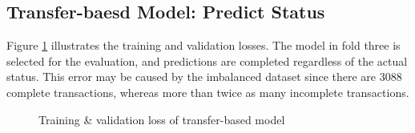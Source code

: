 \documentclass[12pt,twoside]{report}
\begin{document}
\subsection{Transfer-baesd Model: Predict Status}
Figure \ref{transfer_based_status} illustrates the training and validation losses. The model in fold three is selected for the evaluation, and predictions are completed regardless of the actual status. This error may be caused by the imbalanced dataset since there are 3088 complete transactions, whereas more than twice as many incomplete transactions. 

\begin{figure}[!htbp]
	\centering
	\hfill
	\hfill
	\hfil
	\hfil
	\caption{Training \& validation loss of transfer-based model}
	\label{transfer_based_status}
\end{figure}
\end{document}
